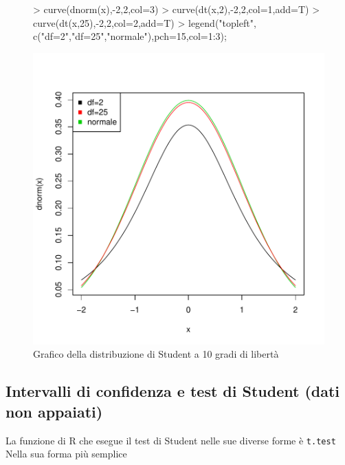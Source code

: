 \documentclass[onecolumn,11pt]{book}
\begin{document}
\begin{figure}[htbp] 
\begin{center}
\begin{Schunk}
\begin{Sinput}
> curve(dnorm(x),-2,2,col=3)
> curve(dt(x,2),-2,2,col=1,add=T)
> curve(dt(x,25),-2,2,col=2,add=T)
> legend("topleft", c("df=2","df=25","normale"),pch=15,col=1:3);
\end{Sinput}
\end{Schunk}
\includegraphics{statisticaconR-193}
\caption{ Grafico della distribuzione di Student a 10 gradi di libert\`a}
\label{fig:graficostudent}
\end{center}
\end{figure}
 \subsection
{Intervalli di confidenza e test di Student (dati non appaiati)}
La funzione di 
\textsf{R} che esegue il test di Student nelle sue diverse forme \`e  \texttt{t.test}   Nella sua forma pi\`u semplice 
\end{document}
